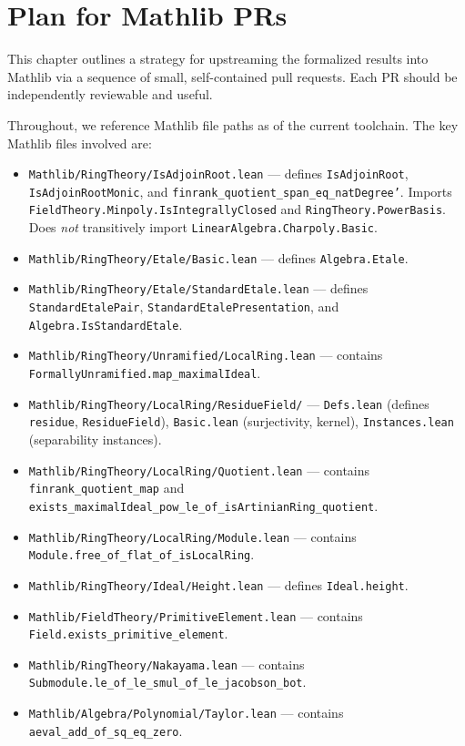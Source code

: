 

\chapter{Plan for Mathlib PRs}
\label{ch:mathlib_plan}

This chapter outlines a strategy for upstreaming the formalized results into
Mathlib via a sequence of small, self-contained pull requests.
Each PR should be independently reviewable and useful.

Throughout, we reference Mathlib file paths as of the current toolchain.
The key Mathlib files involved are:
\begin{itemize}
  \item \texttt{Mathlib/RingTheory/IsAdjoinRoot.lean} ---
    defines \texttt{IsAdjoinRoot}, \texttt{IsAdjoinRootMonic},
    and \texttt{finrank\_quotient\_span\_eq\_natDegree'}.
    Imports \texttt{FieldTheory.Minpoly.IsIntegrallyClosed}
    and \texttt{RingTheory.PowerBasis}.
    Does \emph{not} transitively import \texttt{LinearAlgebra.Charpoly.Basic}.
  \item \texttt{Mathlib/RingTheory/Etale/Basic.lean} ---
    defines \texttt{Algebra.Etale}.
  \item \texttt{Mathlib/RingTheory/Etale/StandardEtale.lean} ---
    defines \texttt{StandardEtalePair}, \texttt{StandardEtalePresentation},
    and \texttt{Algebra.IsStandardEtale}.
  \item \texttt{Mathlib/RingTheory/Unramified/LocalRing.lean} ---
    contains \texttt{FormallyUnramified.map\_maximalIdeal}.
  \item \texttt{Mathlib/RingTheory/LocalRing/ResidueField/} ---
    \texttt{Defs.lean} (defines \texttt{residue}, \texttt{ResidueField}),
    \texttt{Basic.lean} (surjectivity, kernel),
    \texttt{Instances.lean} (separability instances).
  \item \texttt{Mathlib/RingTheory/LocalRing/Quotient.lean} ---
    contains \texttt{finrank\_quotient\_map} and
    \texttt{exists\_maximalIdeal\_pow\_le\_of\_isArtinianRing\_quotient}.
  \item \texttt{Mathlib/RingTheory/LocalRing/Module.lean} ---
    contains \texttt{Module.free\_of\_flat\_of\_isLocalRing}.
  \item \texttt{Mathlib/RingTheory/Ideal/Height.lean} ---
    defines \texttt{Ideal.height}.
  \item \texttt{Mathlib/FieldTheory/PrimitiveElement.lean} ---
    contains \texttt{Field.exists\_primitive\_element}.
  \item \texttt{Mathlib/RingTheory/Nakayama.lean} ---
    contains \texttt{Submodule.le\_of\_le\_smul\_of\_le\_}\allowbreak\texttt{jacobson\_bot}.
  \item \texttt{Mathlib/Algebra/Polynomial/Taylor.lean} ---
    contains \texttt{aeval\_add\_of\_sq\_eq\_zero}.
\end{itemize}


